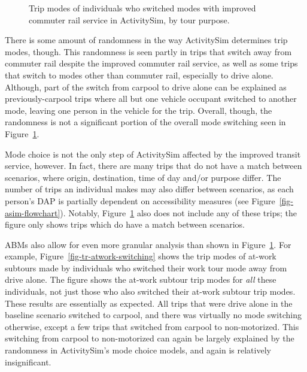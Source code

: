 \documentclass[fancy, oneside, mastersfancy, ms]{byuthesis}
\begin{document}
\begin{figure}


\caption[Trip modes of individuals who switched modes with improved
commuter rail service in ActivitySim.]{\label{fig-tr-mode-switching}Trip
modes of individuals who switched modes with improved commuter rail
service in ActivitySim, by tour purpose.}

\end{figure}%

There is some amount of randomness in the way ActivitySim determines
trip modes, though. This randomness is seen partly in trips that switch
away from commuter rail despite the improved commuter rail service, as
well as some trips that switch to modes other than commuter rail,
especially to drive alone. Although, part of the switch from carpool to
drive alone can be explained as previously-carpool trips where all but
one vehicle occupant switched to another mode, leaving one person in the
vehicle for the trip. Overall, though, the randomness is not a
significant portion of the overall mode switching seen in
Figure~\ref{fig-tr-mode-switching}.

Mode choice is not the only step of ActivitySim affected by the improved
transit service, however. In fact, there are many trips that do not have
a match between scenarios, where origin, destination, time of day and/or
purpose differ. The number of trips an individual makes may also differ
between scenarios, as each person's DAP is partially dependent on
accessibility measures (see Figure~\ref{fig-asim-flowchart}). Notably,
Figure~\ref{fig-tr-mode-switching} also does not include any of these
trips; the figure only shows trips which do have a match between
scenarios.

ABMs also allow for even more granular analysis than shown in
Figure~\ref{fig-tr-mode-switching}. For example,
Figure~\ref{fig-tr-atwork-switching} shows the trip modes of at-work
subtours made by individuals who switched their work tour mode away from
drive alone. The figure shows the at-work subtour trip modes for
\emph{all} these individuals, not just those who also switched their
at-work subtour trip modes. These results are essentially as expected.
All trips that were drive alone in the baseline scenario switched to
carpool, and there was virtually no mode switching otherwise, except a
few trips that switched from carpool to non-motorized. This switching
from carpool to non-motorized can again be largely explained by the
randomness in ActivitySim's mode choice models, and again is relatively
insignificant.
\end{document}
